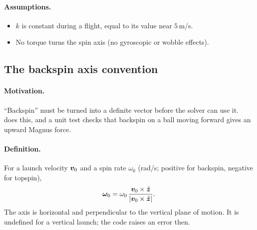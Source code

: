 \paragraph{Assumptions.}
\begin{itemize}
  \item $k$ is constant during a flight, equal to its value near $5$\,\unit{m/s}\assumed.
  \item No torque turns the spin axis (no gyroscopic or wobble effects).
\end{itemize}

\subsection{The backspin axis convention}
\label{sec:flight-axis}

\paragraph{Motivation.}
``Backspin'' must be turned into a definite vector before the solver can use it.
 does this, and a unit test checks that backspin on a ball moving forward
gives an upward Magnus force.

\paragraph{Definition.}
For a launch velocity $\bm{v}_0$ and a spin rate $\omega_0$ (\unit{rad/s}; positive for backspin,
negative for topspin),
\begin{equation}
  \bm{\omega}_0 = \omega_0\,\frac{\bm{v}_0\times\hat{\bm{z}}}{|\bm{v}_0\times\hat{\bm{z}}|}.
  \label{eq:flight-axis}
\end{equation}
The axis is horizontal and perpendicular to the vertical plane of motion.
It is undefined for a vertical launch; the code raises an error then.

